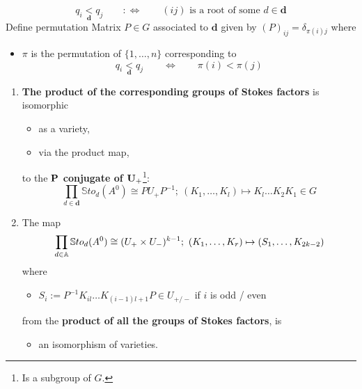 \[
  q_i\underset{\textbf{d}}{<}q_j \qquad :\Leftrightarrow
    \qquad (ij) \text{ is a root of some } d\in\textbf{d}
\]
Define permutation Matrix $P\in G$ associated to $\textbf{d}$ given by
$(P)_{ij}=\delta_{\pi(i)j}$ where
\begin{itemize}
  \item $\pi$ is the permutation of $\{1,\dots,n\}$ corresponding to
  \[
    q_i\underset{\textbf{d}}{<}q_j \qquad \Leftrightarrow \qquad \pi(i)<\pi(j)
  \]
\end{itemize}
\begin{lem}[3.2: 1]
  \begin{enumerate}
    \item \textbf{The product of the corresponding groups of Stokes factors} is
      isomorphic
      \begin{itemize}
        \item as a variety,
        \item via the product map,
      \end{itemize}
      to the \textbf{$\bf P$ conjugate of $\bf U_+$}\footnote{Is a subgroup of
      $G$.}:
      \[
        \prod_{d\in\textbf{d}}\mathbb{S}to_d(A^0)\cong PU_+P^{-1} ;~
        (K_1,\dots,K_l)\mapsto K_l\dots K_2K_1\in G
      \]
    \item The map
      \[
        \prod_{d\in\mathbb{A}}\mathbb{S}to_d(A^0)\cong (U_+\times U_-)^{k-1} ;~
        (K_1,\dots,K_r)\mapsto (S_1,\dots,K_{2k-2})
      \]
      where
      \begin{itemize}
        \item $S_i:=P^{-1}K_{il}\dots K_{(i-1)l+1}P\in U_{+/-}$ if $i$ is
        odd / even
      \end{itemize}
      from the \textbf{product of all the groups of
      Stokes factors}, is
      \begin{itemize}
        \item an isomorphism of varieties.
      \end{itemize}
  \end{enumerate}
\end{lem}
